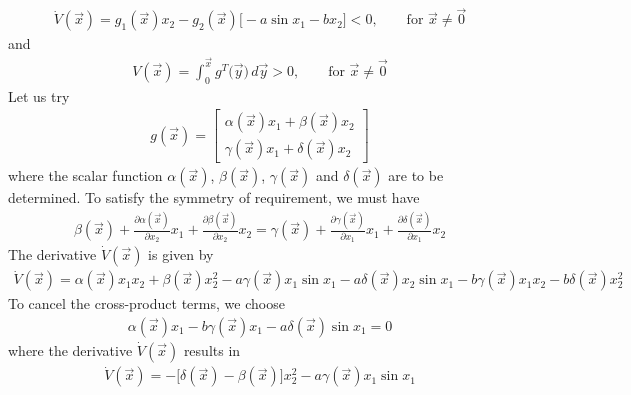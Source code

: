 \documentclass[12pt,a4paper,oneside]{book}
\begin{document}
\begin{onehalfspace}
\begin{example}
	\begin{equation*}
		\begin{aligned}
			\dot{V}(\vec{x})=g_1(\vec{x})x_2-g_2(\vec{x})\Big[-a\sin x_1 -b 
			x_2\Big]<0,\qquad\text{for }\vec{x}\ne\vec{0}
		\end{aligned}
	\end{equation*}
	and
	\begin{equation*}
		\begin{aligned}
			V(\vec{x})=\int_{0}^{\vec{x}} g^T \big(\vec{y}\big) 
			\,d\vec{y}>0,\qquad\text{for }\vec{x}\ne\vec{0}
		\end{aligned}
	\end{equation*}
	Let us try
	\begin{equation*}
		\begin{aligned}
			g(\vec{x})=\begin{bmatrix}
				\alpha(\vec{x})x_1+\beta(\vec{x})x_2 \\[6pt] 
				\gamma(\vec{x})x_1+\delta(\vec{x})x_2
			\end{bmatrix}
		\end{aligned}
	\end{equation*}
	where the scalar function $\alpha(\vec{x})$, $\beta(\vec{x})$, 
	$\gamma(\vec{x})$ and $\delta(\vec{x})$ are to be determined. To satisfy 
	the symmetry of requirement, we must have
	\begin{equation}\label{example1}
		\begin{aligned}
			\beta(\vec{x})+\frac{\partial\alpha(\vec{x})}{\partial 
			x_2}x_1+\frac{\partial\beta(\vec{x})}{\partial 
			x_2}x_2=\gamma(\vec{x})+\frac{\partial\gamma(\vec{x})}{\partial 
			x_1}x_1+\frac{\partial\delta(\vec{x})}{\partial x_1}x_2
		\end{aligned}
	\end{equation}
	The derivative $\dot{V}(\vec{x})$ is given by
	\begin{equation*}
		\begin{aligned}
			\dot{V}(\vec{x}) = 
			\alpha(\vec{x})x_1x_2+\beta(\vec{x})x_2^2-a\gamma(\vec{x})x_1\sin 
			x_1-a\delta(\vec{x})x_2\sin 
			x_1-b\gamma(\vec{x})x_1x_2-b\delta(\vec{x})x_2^2
		\end{aligned}
	\end{equation*}
	To cancel the cross-product terms, we choose
	\begin{equation}\label{example2}
		\begin{aligned}
			\alpha(\vec{x})x_1-b\gamma(\vec{x})x_1-a\delta(\vec{x})\sin x_1=0
		\end{aligned}
	\end{equation}
	where the derivative $\dot{V}(\vec{x})$ results in 
	\begin{equation*}
		\begin{aligned}
			\dot{V}(\vec{x}) = 
			-\Big[\delta(\vec{x})-\beta(\vec{x})\Big]x_2^2-a\gamma(\vec{x})x_1\sin
			 x_1
		\end{aligned}
	\end{equation*}
	

\end{example}
\end{onehalfspace}
\end{document}
